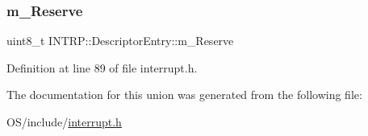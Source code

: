 \subsubsection{\texorpdfstring{m\+\_\+\+Reserve}{m\_Reserve}}
{\footnotesize\ttfamily uint8\+\_\+t I\+N\+T\+R\+P\+::\+Descriptor\+Entry\+::m\+\_\+\+Reserve}



Definition at line 89 of file interrupt.\+h.



The documentation for this union was generated from the following file\+:\begin{DoxyCompactItemize}
\item 
O\+S/include/\hyperlink{interrupt_8h}{interrupt.\+h}\end{DoxyCompactItemize}
